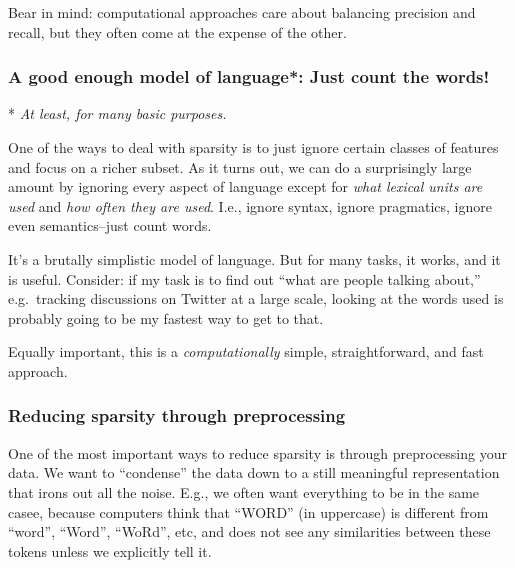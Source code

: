 \documentclass[11pt]{article}
\begin{document}
Bear in mind: computational approaches care about balancing precision
and recall, but they often come at the expense of the other.

    \hypertarget{a-good-enough-model-of-language-just-count-the-words}{%
\subsubsection{A good enough model of language*: Just count the
words!}\label{a-good-enough-model-of-language-just-count-the-words}}

* \emph{At least, for many basic purposes.}

One of the ways to deal with sparsity is to just ignore certain classes
of features and focus on a richer subset. As it turns out, we can do a
surprisingly large amount by ignoring every aspect of language except
for \emph{what lexical units are used} and \emph{how often they are
used}. I.e., ignore syntax, ignore pragmatics, ignore even
semantics--just count words.

It's a brutally simplistic model of language. But for many tasks, it
works, and it is useful. Consider: if my task is to find out ``what are
people talking about,'' e.g.~tracking discussions on Twitter at a large
scale, looking at the words used is probably going to be my fastest way
to get to that.

Equally important, this is a \emph{computationally} simple,
straightforward, and fast approach.

    \hypertarget{reducing-sparsity-through-preprocessing}{%
\subsubsection{Reducing sparsity through
preprocessing}\label{reducing-sparsity-through-preprocessing}}

One of the most important ways to reduce sparsity is through
preprocessing your data. We want to ``condense'' the data down to a
still meaningful representation that irons out all the noise. E.g., we
often want everything to be in the same casee, because computers think
that ``WORD'' (in uppercase) is different from ``word'', ``Word'',
``WoRd'', etc, and does not see any similarities between these tokens
unless we explicitly tell it.
\end{document}
